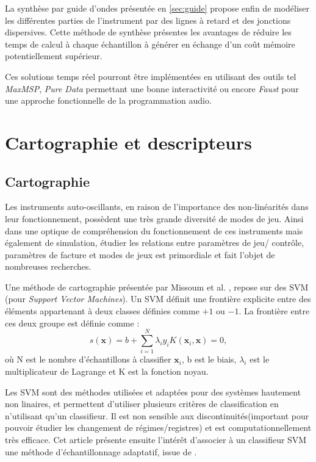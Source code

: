 \documentclass[atiam, article]{rapport} %
\begin{document}
La synthèse par guide d'ondes \cite{smith1987music} présentée en \ref{sec:guide} propose enfin de modéliser les différentes parties de l'instrument par des lignes à retard et des jonctions dispersives.
Cette méthode de synthèse présentes les avantages de réduire les temps de calcul à chaque échantillon à générer en échange d'un coût mémoire potentiellement supérieur.

Ces solutions temps réel pourront être implémentées en utilisant des outils tel \textit{MaxMSP}, \textit{Pure Data} permettant une bonne interactivité ou encore \textit{Faust} pour une approche fonctionnelle de la programmation audio.

\section{Cartographie et descripteurs}
\subsection{Cartographie}
Les instruments auto-oscillants, en raison de l'importance des non-linéarités dans leur fonctionnement, possèdent une très grande diversité de modes de jeu. Ainsi dans une optique de compréhension du fonctionnement de ces instruments mais également de simulation, étudier les relations entre paramètres de jeu/ contrôle, paramètres de facture et modes de jeux est primordiale et fait l'objet de nombreuses recherches. 

Une méthode de cartographie présentée par Missoum et al. \cite{missoum_explicit_2014}, repose sur des SVM (pour \textit{Support Vector Machines}). 
Un SVM définit une frontière explicite entre des éléments appartenant à deux classes définies comme $+1$ ou $-1$. 
La frontière entre ces deux groupe est définie comme \cite{missoum_explicit_2014} : 
\begin{equation}
    s(\textbf{x}) = b + \sum_{i=1}^{N}\lambda_iy_iK(\textbf{x}_i,\textbf{x}) = 0 ,
\end{equation}
où N est le nombre d'échantillons à classifier $\textbf{x}_i$, b est le biais, $\lambda_i$ est le multiplicateur de Lagrange et K est la fonction noyau. 

Les SVM sont des méthodes utilisées et adaptées pour des systèmes hautement non linaires, et permettent d'utiliser plusieurs critères de classification en n'utilisant qu'un classifieur. Il est non sensible aux discontinuités(important pour pouvoir étudier les changement de régimes/registres) et est computationnellement très efficace. Cet article présente ensuite l'intérêt d'associer à un classifieur SVM une méthode d'échantillonnage  adaptatif, issue de \cite{basudhar2010improved}. 
\end{document}
